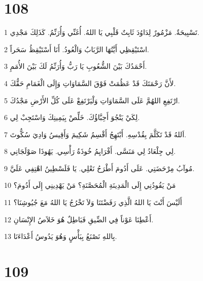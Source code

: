 \chapter{108}

\par 1 تَسْبِيحَةٌ. مَزْمُورٌ لِدَاوُدَ ثَابِتٌ قَلْبِي يَا اللهُ. أُغَنِّي وَأُرَنِّمُ. كَذَلِكَ مَجْدِي.
\par 2 اسْتَيْقِظِي أَيَّتُهَا الرَّبَابُ وَالْعُودُ. أَنَا أَسْتَيْقِظُ سَحَراً.
\par 3 أَحْمَدُكَ بَيْنَ الشُّعُوبِ يَا رَبُّ وَأُرَنِّمُ لَكَ بَيْنَ الأُمَمِ.
\par 4 لأَنَّ رَحْمَتَكَ قَدْ عَظُمَتْ فَوْقَ السَّمَاوَاتِ وَإِلَى الْغَمَامِ حَقُّكَ.
\par 5 ارْتَفِعِ اللهُمَّ عَلَى السَّمَاوَاتِ وَلْيَرْتَفِعْ عَلَى كُلِّ الأَرْضِ مَجْدُكَ.
\par 6 لِكَيْ يَنْجُوَ أَحِبَّاؤُكَ. خَلِّصْ بِيَمِينِكَ وَاسْتَجِبْ لِي.
\par 7 اَللهُ قَدْ تَكَلَّمَ بِقُدْسِهِ. أَبْتَهِجُ أَقْسِمُ شَكِيمَ وَأَقِيسُ وَادِيَ سُكُّوتَ.
\par 8 لِي جِلْعَادُ لِي مَنَسَّى. أَفْرَايِمُ خُوذَةُ رَأْسِي. يَهُوذَا صَوْلَجَانِي.
\par 9 مُوآبُ مِرْحَضَتِي. عَلَى أَدُومَ أَطْرَحُ نَعْلِي. يَا فَلَسْطِينُ اهْتِفِي عَلَيَّ.
\par 10 مَنْ يَقُودُنِي إِلَى الْمَدِينَةِ الْمُحَصَّنَةِ؟ مَنْ يَهْدِينِي إِلَى أَدُومَ؟
\par 11 أَلَيْسَ أَنْتَ يَا اللهُ الَّذِي رَفَضْتَنَا وَلاَ تَخْرُجُ يَا اللهُ مَعَ جُيُوشِنَا؟
\par 12 أَعْطِنَا عَوْناً فِي الضِّيقِ فَبَاطِلٌ هُوَ خَلاَصُ الإِنْسَانِ.
\par 13 بِاللهِ نَصْنَعُ بِبَأْسٍ وَهُوَ يَدُوسُ أَعْدَاءَنَا.

\chapter{109}


